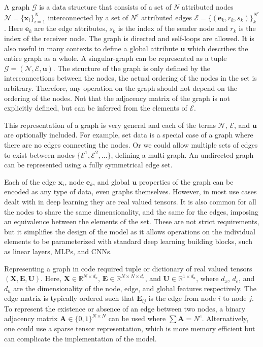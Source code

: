 A graph $\mathcal{G}$ is a data structure that consists of a set of $N$ attributed nodes $\mathcal{N} = \{\mathbf{x}_i\}_{i=1}^{N}$ interconnected by a set of $N^e$ attributed edges $\mathcal{E} = \{(\mathbf{e}_{k}, r_k, s_k)\}_{k}^{N^e}$.
Here $\mathbf{e}_{k}$ are the edge attributes, $s_k$ is the index of the sender node and $r_k$ is the index of the receiver node.
The graph is directed and self-loops are allowed.
It is also useful in many contexts to define a global attribute $\mathbf{u}$ which describes the entire graph as a whole.
A singular-graph can be represented as a tuple $\mathcal{G} = (\mathcal{N}, \mathcal{E}, \mathbf{u})$.
The structure of the graph is only defined by the interconnections between the nodes, the actual ordering of the nodes in the set is arbitrary.
Therefore, any operation on the graph should not depend on the ordering of the nodes.
Not that the adjacency matrix of the graph is not explicitly defined, but can be inferred from the elements of $\mathcal{E}$.

This representation of a graph is very general and each of the terms $\mathcal{N}$, $\mathcal{E}$, and $\mathbf{u}$ are optionally included.
For example, set data is a special case of a graph where there are no edges connecting the nodes.
Or we could allow multiple sets of edges to exist between nodes $\{\mathcal{E}^1, \mathcal{E}^2, \ldots\}$, defining a multi-graph.
An undirected graph can be represented using a fully symmetrical edge set.

Each of the edge $\mathbf{x}_i$, node $\mathbf{e}_{k}$, and global $\mathbf{u}$ properties of the graph can be encoded as any type of data, even graphs themselves.
However, in most use cases dealt with in deep learning they are real valued tensors.
It is also common for all the nodes to share the same dimensionality, and the same for the edges, imposing an equivalence between the elements of the set.
These are not strict requirements, but it simplifies the design of the model as it allows operations on the individual elements to be parameterized with standard deep learning building blocks, such as linear layers, MLPs, and CNNs.

Representing a graph in code required tuple or dictionary of real valued tensors $(\mathbf{X}, \mathbf{E}, \mathbf{U})$.
Here, $\mathbf{X} \in \mathbb{R}^{N \times d_x}$, $\mathbf{E} \in \mathbb{R}^{N \times N \times d_e}$, and $\mathbf{U} \in \mathbb{R}^{1 \times d_u}$, where $d_x$, $d_e$, and $d_u$ are the dimensionality of the node, edge, and global features respectively.
The edge matrix is typically ordered such that $\mathbf{E}_{ij}$ is the edge from node $i$ to node $j$.
To represent the existence or absence of an edge between two nodes, a binary adjacency matrix $\mathbf{A} \in \{0, 1\}^{N \times N}$ can be used where $\sum{\mathbf{A}} = N^e$.
Alternatively, one could use a sparse tensor representation, which is more memory efficient but can complicate the implementation of the model.

